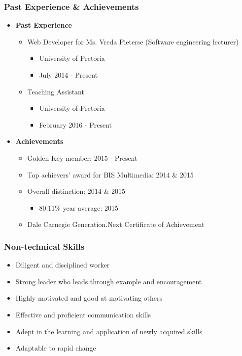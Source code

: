 \documentclass{article}
\begin{document}
	\subsubsection{Past Experience \& Achievements}
		\begin{itemize}
			\item \textbf{Past Experience}
			\begin{itemize}
				\item Web Developer for Ms. Vreda Pieterse (Software engineering lecturer)
				\begin{itemize}
					\item University of Pretoria
					\item July 2014 - Present
				\end{itemize}
				\item Teaching Assistant
				\begin{itemize}
					\item University of Pretoria
					\item February 2016 - Present
				\end{itemize}
			\end{itemize}
			
			\item \textbf{Achievements}
			\begin{itemize}
				\item Golden Key member: 2015 - Present
				\item Top achievers' award for BIS Multimedia: 2014 \& 2015
				\item Overall distinction: 2014 \& 2015
				\begin{itemize}
					\item 80.11\% year average: 2015
				\end{itemize}
				\item Dale Carnegie Generation.Next Certificate of Achievement
			\end{itemize}
		\end{itemize}
		
	\subsubsection{Non-technical Skills}
		\begin{itemize}
			\item Diligent and disciplined worker
			\item Strong leader who leads through example and encouragement
			\item Highly motivated and good at motivating others
			\item Effective and proficient communication skills
			\item Adept in the learning and application of newly acquired skills
			\item Adaptable to rapid change
		\end{itemize}
\end{document}
